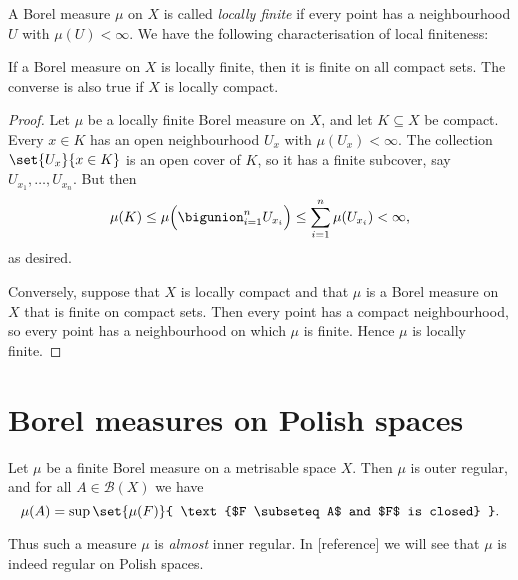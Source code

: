 \documentclass[article, a4paper, 11pt, oneside]{memoir}
\numberwithin{equation}{chapter}
\newcommand{\calB}{\mathcal{B}}
\newcommand{\borel}[1]{\calB(#1)}
\begin{document}
A Borel measure $\mu$ on $X$ is called \emph{locally finite} if every point has a neighbourhood $U$ with $\mu(U) < \infty$. We have the following characterisation of local finiteness:

\begin{proposition}
    \label{thm:local-finiteness-compacts}
    If a Borel measure on $X$ is locally finite, then it is finite on all compact sets. The converse is also true if $X$ is locally compact.
\end{proposition}

\begin{proof}
    Let $\mu$ be a locally finite Borel measure on $X$, and let $K \subseteq X$ be compact. Every $x \in K$ has an open neighbourhood $U_x$ with $\mu(U_x) < \infty$. The collection $\set{U_x}{x \in K}$ is an open cover of $K$, so it has a finite subcover, say $U_{x_1}, \ldots, U_{x_n}$. But then
    \begin{equation*}
        \mu(K)
            \leq \mu \Bigl( \bigunion_{i=1}^n U_{x_i} \Bigr)
            \leq \sum_{i=1}^n \mu(U_{x_i})
            < \infty,
    \end{equation*}
    as desired.

    Conversely, suppose that $X$ is locally compact and that $\mu$ is a Borel measure on $X$ that is finite on compact sets. Then every point has a compact neighbourhood, so every point has a neighbourhood on which $\mu$ is finite. Hence $\mu$ is locally finite.
\end{proof}


\section{Borel measures on Polish spaces}

\begin{lemma}
    Let $\mu$ be a finite Borel measure on a metrisable space $X$. Then $\mu$ is outer regular, and for all $A \in \borel{X}$ we have
    \begin{equation}
        \label{eq:closed-inner-regularity}
        \mu(A)
            = \sup \set{\mu(F)}{ \text{$F \subseteq A$ and $F$ is closed} }.
    \end{equation}
\end{lemma}
%
Thus such a measure $\mu$ is \emph{almost} inner regular. In [reference] we will see that $\mu$ is indeed regular on Polish spaces.

\newcommand{\calA}{\mathcal{A}}
\end{document}
